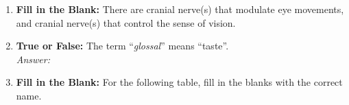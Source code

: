 \begin{enumerate}[label=\textbf{Q1.7.\arabic*}]
      \item \textbf{Fill in the Blank:} There are \underline{\hspace{3cm}} cranial nerve(s) that modulate eye movements, and \underline{\hspace{3cm}} cranial nerve(s) that control the sense of vision. \\

      \item \textbf{True or False:} The term ``\textit{glossal}'' means ``taste''. \\
            \textit{Answer:} %

      \item \textbf{Fill in the Blank:} For the following table, fill in the blanks with the correct name.


\end{enumerate}
